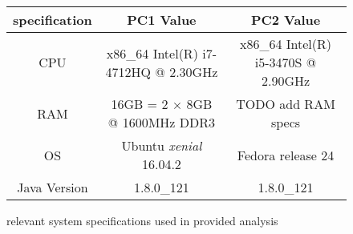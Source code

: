 \documentclass[]{article}
\begin{document}
\begin{figure}[h]
	\begin{center}
		\begin{tabular}{ | c | c | c | }
			\hline
			specification & PC1 Value & PC2 Value \\
			\hline
			CPU & x86\_64 Intel(R) i7-4712HQ @ 2.30GHz & x86\_64 Intel(R) i5-3470S @ 2.90GHz\\
			\hline
			RAM & 16GB = 2 $\times$ 8GB @ 1600MHz DDR3 & TODO add RAM specs \\ 
			\hline
			OS & Ubuntu \emph{xenial} 16.04.2 & Fedora release 24\\
			\hline
			Java Version & 1.8.0\_121 & 1.8.0\_121\\
			\hline
		\end{tabular}
	\end{center}
	\caption{relevant system specifications used in provided analysis\label{fig:specs}}
\end{figure}
\nocite{*}



\end{document}
